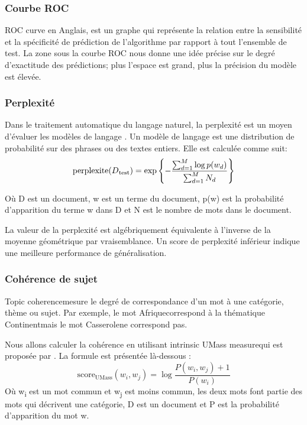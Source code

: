         \subsubsection{Courbe ROC} 
        \textquotedbl ROC curve en Anglais\textquotedbl, est un graphe qui représente la relation entre la sensibilité et la spécificité de prédiction de l'algorithme par rapport à tout l'ensemble de test. La zone sous la courbe ROC nous donne une idée précise sur le degré d’exactitude des prédictions; plus l'espace est grand, plus la précision du modèle est élevée. 
        
        \subsubsection{Perplexité}
        Dans le traitement automatique du langage naturel, la perplexité est un moyen d'évaluer les modèles de langage \cite{perplexite}. Un modèle de langage est une distribution de probabilité sur des phrases ou des textes entiers. Elle est calculée comme suit:
        \[
        \text{perplexite}(D\textsubscript{test}) =
        \exp
        \left \{-\frac{\sum_{d=1}^{M}{\log{p(w_d)}}}{\sum_{d=1}^{M}{N_d}}\right\}
        \]

        Où D est un document, w est un terme du document, p(w) est la probabilité d'apparition du terme w dans D et N est le nombre de mots dans le document.

        La valeur de la perplexité est algébriquement équivalente à l'inverse de la moyenne géométrique par vraisemblance. Un score de perplexité inférieur indique une meilleure performance de généralisation.

        \subsubsection{Cohérence de sujet}
        \textquotedbl Topic coherence\textquotedbl mesure le degré de correspondance d'un mot à une catégorie, thème ou sujet. Par exemple, le mot \textquotedbl Afrique\textquotedbl correspond à la thématique \textquotedbl Continent\textquotedbl mais le mot \textquotedbl Casserole\textquotedbl ne correspond pas.

        Nous allons calculer la cohérence en utilisant \textquotedbl intrinsic UMass measure\textquotedbl qui est proposée par \cite{perplexite}. La formule est présentée là-dessous :
        \[
        \text{score}_{\text{UMass}}(w_i, w_j) =
        \log
        \frac{P(w_i, w_j) + 1}{P(w_i)}
        \]
        Où w\textsubscript{i} est un mot commun et w\textsubscript{j} est moins commun, les deux mots font partie des mots qui décrivent une catégorie, D est un document et P est la probabilité d'apparition du mot w. 

